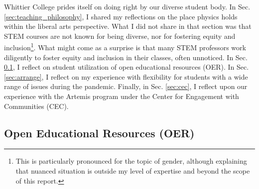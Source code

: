 \documentclass[../../../main.tex]{subfiles}
\begin{document}
Whittier College prides itself on doing right by our diverse student body.  In Sec. \ref{sec:teaching_philosophy}, I shared my reflections on the place physics holds within the liberal arts perspective.  What I did not share in that section was that STEM courses are not known for being diverse, nor for fostering equity and inclusion\footnote{This is particularly pronounced for the topic of gender, although explaining that nuanced situation is outside my level of expertise and beyond the scope of this report.}.  What might come as a surprise is that many STEM professors work diligently to foster equity and inclusion in their classes, often unnoticed.  In Sec. \ref{sec:oer}, I reflect on student utilization of open educational resources (OER).  In Sec. \ref{sec:arrange}, I reflect on my experience with flexibility for students with a wide range of issues during the pandemic.  Finally, in Sec. \ref{sec:cec}, I reflect upon our experience with the Artemis program under the Center for Engagement with Communities (CEC).

\subsection{Open Educational Resources (OER)}
\label{sec:oer}
\end{document}
